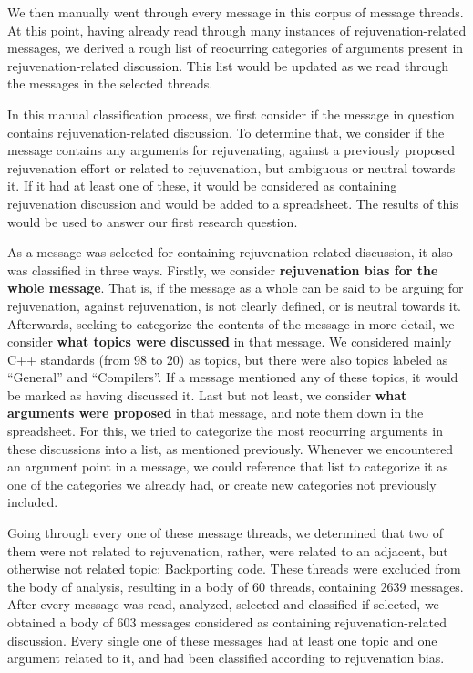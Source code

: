 We then manually went through every message in this corpus of message threads. At this point, having already read through many instances of rejuvenation-related messages, we derived a rough list of reocurring categories of arguments present in rejuvenation-related discussion. This list would be updated as we read through the messages in the selected threads.

In this manual classification process, we first consider if the message in question contains rejuvenation-related discussion. To determine that, we consider if the message contains any arguments for rejuvenating, against a previously proposed rejuvenation effort or related to rejuvenation, but ambiguous or neutral towards it. If it had at least one of these, it would be considered as containing rejuvenation discussion and would be added to a spreadsheet. The results of this would be used to answer our first research question.

As a message was selected for containing rejuvenation-related discussion, it also was classified in three ways. Firstly, we consider \textbf{rejuvenation bias for the whole message}. That is, if the message as a whole can be said to be arguing for rejuvenation, against rejuvenation, is not clearly defined, or is neutral towards it. Afterwards, seeking to categorize the contents of the message in more detail, we consider \textbf{what topics were discussed} in that message. We considered mainly C++ standards (from 98 to 20) as topics, but there were also topics labeled as ``General'' and ``Compilers''. If a message mentioned any of these topics, it would be marked as having discussed it. Last but not least, we consider \textbf{what arguments were proposed} in that message, and note them down in the spreadsheet. For this, we tried to categorize the most reocurring arguments in these discussions into a list, as mentioned previously. Whenever we encountered an argument point in a message, we could reference that list to categorize it as one of the categories we already had, or create new categories not previously included.

Going through every one of these message threads, we determined that two of them were not related to rejuvenation, rather, were related to an adjacent, but otherwise not related topic: Backporting code. These threads were excluded from the body of analysis, resulting in a body of 60 threads, containing 2639 messages. After every message was read, analyzed, selected and classified if selected, we obtained a body of 603 messages considered as containing rejuvenation-related discussion. Every single one of these messages had at least one topic and one argument related to it, and had been classified according to rejuvenation bias.


